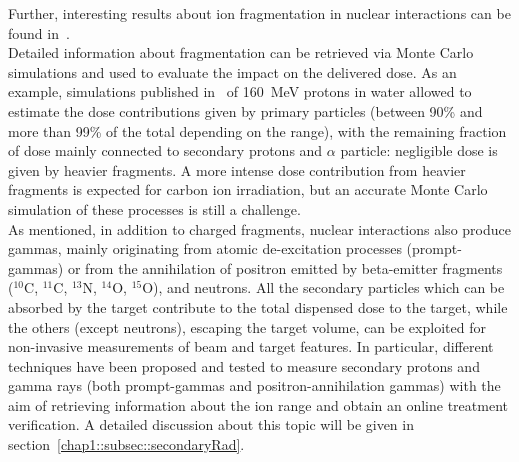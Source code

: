 Further, interesting results about ion fragmentation in nuclear interactions can be found in~\cite{Matsufuji2003, Wroe2005, Haettner2006, Gunzert-Marx2008, Haettner2013}.\\

Detailed information about fragmentation can be retrieved via Monte Carlo simulations and used to evaluate the impact on the delivered dose. As an example, simulations published in~\parencite{Grassberger2011} of 160~MeV protons in water allowed to estimate the dose contributions given by primary particles (between 90\% and more than 99\% of the total depending on the range), with the remaining fraction of dose mainly connected to secondary protons and $\alpha$ particle: negligible dose is given by heavier fragments. A more intense dose contribution from heavier fragments is expected for carbon ion irradiation, but an accurate Monte Carlo simulation of these processes is still a challenge. \\
As mentioned, in addition to charged fragments, nuclear interactions also produce gammas, mainly originating from atomic de-excitation processes (prompt-gammas) or from the annihilation of positron emitted by beta-emitter fragments ($^{10}$C, $^{11}$C, $^{13}$N, $^{14}$O, $^{15}$O), and neutrons. All the secondary particles which can be absorbed by the target contribute to the total dispensed dose to the target, while the others (except neutrons), escaping the target volume, can be exploited for non-invasive measurements of beam and target features. In particular, different techniques have been proposed and tested to measure secondary protons and gamma rays (both prompt-gammas and positron-annihilation gammas) with the aim of retrieving information about the ion range and obtain an online treatment verification. A detailed  discussion about this topic will be given in section~\ref{chap1::subsec::secondaryRad}.\\

